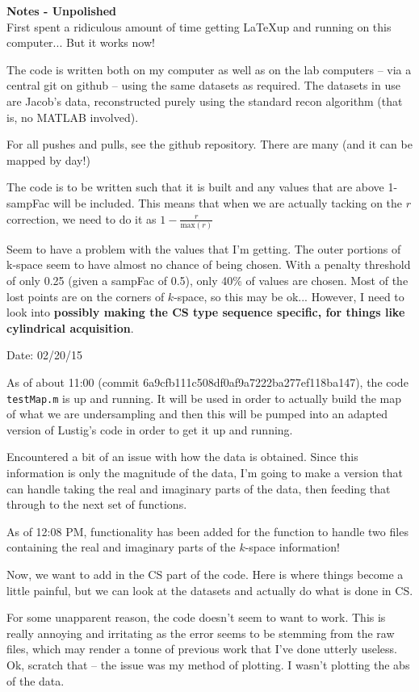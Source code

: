 \documentclass[pra,11 pt]{revtex4-1}
\newcommand{\bo}{\noindent\textbf}
\begin{document}
\bo{Notes - Unpolished}\\
First spent a ridiculous amount of time getting \LaTeX up and running on this computer... But it works now! 

The code is written both on my computer as well as on the lab computers -- via a central git on github -- using the same datasets as required. The datasets in use are Jacob's data, reconstructed purely using the standard recon algorithm (that is, no MATLAB involved).

For all pushes and pulls, see the github repository. There are many (and it can be mapped by day!)

The code is to be written such that it is built and any values that are above 1-sampFac will be included. This means that when we are actually tacking on the $r$ correction, we need to do it as $1-\frac{r}{\text{max}(r)}$

Seem to have a problem with the values that I'm getting. The outer portions of k-space seem to have almost no chance of being chosen. With a penalty threshold of only 0.25 (given a sampFac of 0.5), only 40\% of values are chosen. Most of the lost points are on the corners of $k$-space, so this may be ok... However, I need to look into \textbf{possibly making the CS type sequence specific, for things like cylindrical acquisition}.

Date: 02/20/15

As of about 11:00 (commit 6a9cfb111c508df0af9a7222ba277ef118ba147), the code \verb!testMap.m! is up and running. It will be used in order to actually build the map of what we are undersampling and then this will be pumped into an adapted version of Lustig's code in order to get it up and running.

Encountered a bit of an issue with how the data is obtained. Since this information is only the magnitude of the data, I'm going to make a version that can handle taking the real and imaginary parts of the data, then feeding that through to the next set of functions.

As of 12:08 PM, functionality has been added for the function to handle two files containing the real and imaginary parts of the $k$-space information!

Now, we want to add in the CS part of the code. Here is where things become a little painful, but we can look at the datasets and actually do what is done in CS.

For some unapparent reason, the code doesn't seem to want to work. This is really annoying and irritating as the error seems to be stemming from the raw files, which may render a tonne of previous work that I've done utterly useless. Ok, scratch that -- the issue was my method of plotting. I wasn't plotting the abs of the data. 
\end{document}
